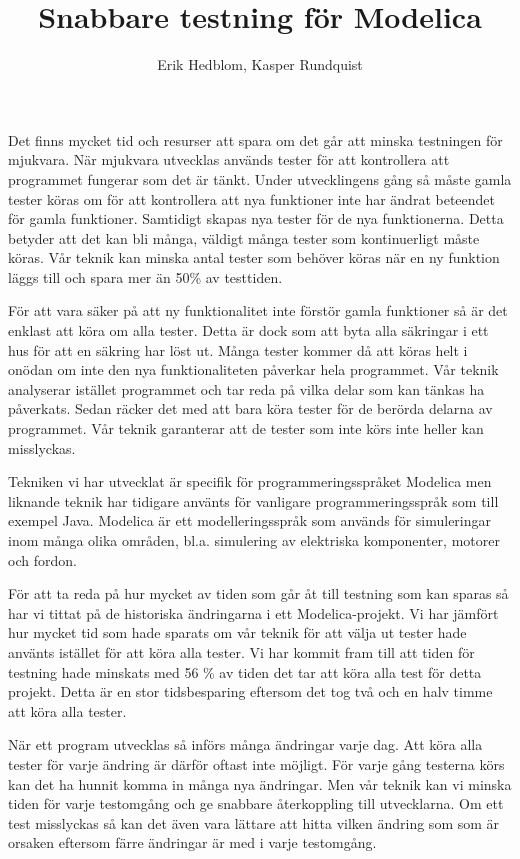 \documentclass{popsci}
\author{Erik Hedblom, Kasper Rundquist}
\title{Snabbare testning för Modelica}
\begin{document}


{\noindent Det finns mycket tid och resurser att spara om det går att minska testningen för mjukvara. När mjukvara utvecklas används tester för att kontrollera att programmet fungerar som det är tänkt. Under utvecklingens gång så måste gamla tester köras om för att kontrollera att nya funktioner inte har ändrat beteendet för gamla funktioner. Samtidigt skapas nya tester för de nya funktionerna. Detta betyder att det kan bli många, väldigt många tester som kontinuerligt måste köras. Vår teknik kan minska antal tester som behöver köras när en ny funktion läggs till och spara mer än 50\% av testtiden. 

För att vara säker på att ny funktionalitet inte förstör gamla funktioner så är det enklast att köra om alla tester. Detta är dock som att byta alla säkringar i ett hus för att en säkring har löst ut. Många tester kommer då att köras helt i onödan om inte den nya funktionaliteten påverkar hela programmet. Vår teknik analyserar istället programmet och tar reda på vilka delar som kan tänkas ha påverkats. Sedan räcker det med att bara köra tester för de berörda delarna av programmet. Vår teknik garanterar att de tester som inte körs inte heller kan misslyckas.

Tekniken vi har utvecklat är specifik för programmeringsspråket Modelica men liknande teknik har tidigare använts för vanligare programmeringsspråk som till exempel Java. Modelica är ett modelleringsspråk som används för simuleringar inom många olika områden, bl.a. simulering av elektriska komponenter, motorer och fordon. 

För att ta reda på hur mycket av tiden som går åt till testning som kan sparas så har vi tittat på de historiska ändringarna i ett Modelica-projekt. Vi har jämfört hur mycket tid som hade sparats om vår teknik för att välja ut tester hade använts istället för att köra alla tester. Vi har kommit fram till att tiden för testning hade minskats med 56 \% av tiden det tar att köra alla test för detta projekt. Detta är en stor tidsbesparing eftersom det tog två och en halv timme att köra alla tester.

När ett program utvecklas så införs många ändringar varje dag. Att köra alla tester för varje ändring är därför oftast inte möjligt. För varje gång testerna körs kan det ha hunnit komma in många nya ändringar. Men vår teknik kan vi minska tiden för varje testomgång och ge snabbare återkoppling till utvecklarna. Om ett test misslyckas så kan det även vara lättare att hitta vilken ändring som som är orsaken eftersom färre ändringar är med i varje testomgång. 
}
\end{document}
